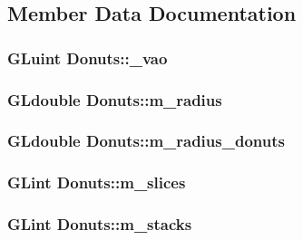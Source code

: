 \subsection{Member Data Documentation}
\hypertarget{class_donuts_a659c70b043ddc2ebcdc64bcb58c1e621}{
\subsubsection[{\+\_\+vao}]{\setlength{\rightskip}{0pt plus 5cm}G\+Luint Donuts\+::\+\_\+vao\hspace{0.3cm}{\ttfamily [private]}}}\label{class_donuts_a659c70b043ddc2ebcdc64bcb58c1e621}
\hypertarget{class_donuts_ae3db8d4ea17228ed43d388bac7fb35b3}{
\subsubsection[{m\+\_\+radius}]{\setlength{\rightskip}{0pt plus 5cm}G\+Ldouble Donuts\+::m\+\_\+radius\hspace{0.3cm}{\ttfamily [private]}}}\label{class_donuts_ae3db8d4ea17228ed43d388bac7fb35b3}
\hypertarget{class_donuts_a5050c790a74b5313a06b818a7f3e8723}{
\subsubsection[{m\+\_\+radius\+\_\+donuts}]{\setlength{\rightskip}{0pt plus 5cm}G\+Ldouble Donuts\+::m\+\_\+radius\+\_\+donuts\hspace{0.3cm}{\ttfamily [private]}}}\label{class_donuts_a5050c790a74b5313a06b818a7f3e8723}
\hypertarget{class_donuts_a2214ac47effb92c5de33fa7c57d28694}{
\subsubsection[{m\+\_\+slices}]{\setlength{\rightskip}{0pt plus 5cm}G\+Lint Donuts\+::m\+\_\+slices\hspace{0.3cm}{\ttfamily [private]}}}\label{class_donuts_a2214ac47effb92c5de33fa7c57d28694}
\hypertarget{class_donuts_a5273bc3a4bdada5e4302b35d49bdd550}{
\subsubsection[{m\+\_\+stacks}]{\setlength{\rightskip}{0pt plus 5cm}G\+Lint Donuts\+::m\+\_\+stacks\hspace{0.3cm}{\ttfamily [private]}}}\label{class_donuts_a5273bc3a4bdada5e4302b35d49bdd550}
